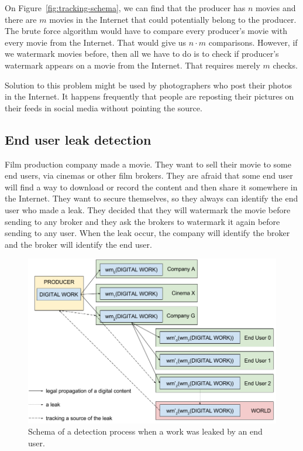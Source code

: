 \documentclass[a4paper,12pt]{article}
\begin{document}
On Figure~\ref{fig:tracking-schema}, we can find that the producer has $n$
movies and there are $m$ movies in the Internet that could potentially belong to
the producer. The brute force algorithm would have to compare every producer's
movie with every movie from the Internet. That would give us $n\cdot m$
comparisons. However, if we watermark movies before, then all we have to do
is to check if producer's watermark appears on a movie from the Internet. That
requires merely $m$ checks.

Solution to this problem might be used by photographers who post their photos in
the Internet. It happens frequently that people are reposting their pictures on
their feeds in social media without pointing the source.

\subsection*{End user leak detection}

Film production company made a movie. They want to sell their movie to some end
users, via cinemas or other film brokers. They are afraid that some end user
will find a way to download or record the content and then share it somewhere in
the Internet. They want to secure themselves, so they always can identify
the end user who made a leak. They decided that they will watermark the movie
before sending to any broker and they ask the brokers to watermark it again
before sending to any user. When the leak occur, the company will identify
the broker and the broker will identify the end user.
\begin{figure}[ht]
  \centering
    \includegraphics[width=1.0\textwidth]{../../images/leak-detection-with-a-broker.png}
  \caption{Schema of a detection process when a work was leaked by an end user.}
  \label{fig:end-user-schema}
\end{figure}
\end{document}
